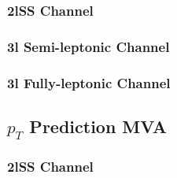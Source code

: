 \subsubsection{2lSS Channel}
\label{subsec:higgs2lSS}




\subsubsection{3l Semi-leptonic Channel}
\label{subsec:higgs3lS}




\subsubsection{3l Fully-leptonic Channel}                                  
\label{subsec:higgs3lF}                                                                                                   




\subsection{$p_T$ Prediction MVA}
\label{subsec:ptMVA}

\subsubsection{2lSS Channel}                                                                          
\label{subsec:pt2lSS}                                                                                           



